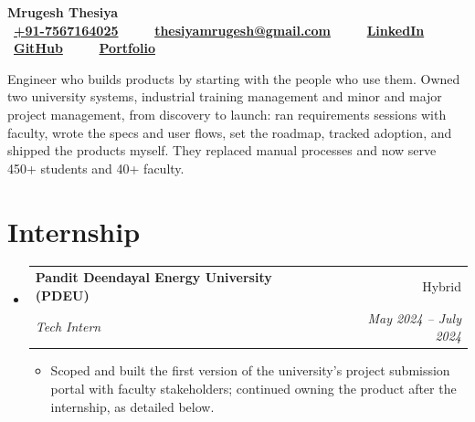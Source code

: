 \documentclass[a4paper,11pt]{article}
\makeatletter
\newcommand{\resumeSubheadingFull}[4]{
  \vspace{-1pt}\item
    \begin{tabular*}{0.97\textwidth}{l@{\extracolsep{\fill}}r}
    \textbf{#1} & #2 \\
    \textit{#3} & \textit{#4} \\
    \end{tabular*}\vspace{-5pt}
}
\newcommand{\resumeSubHeadingListStart}{\begin{itemize}[leftmargin=*]}
\newcommand{\resumeSubHeadingListEnd}{\end{itemize}}
\newcommand{\resumeItemListStart}{\begin{itemize}[itemsep=1pt,topsep=3pt]\small}
\newcommand{\resumeItemListEnd}{\end{itemize}\vspace{-3pt}}
\makeatother
\begin{document}
\begin{center}
    \vspace*{-14pt}
    {\fontsize{32}{36}\selectfont \textbf{Mrugesh Thesiya}}\\[7pt]
    {\small
    \faPhone ~\textbf{\href{tel:+917567164025}{+91-7567164025}}~~~~
    \faEnvelope ~\textbf{\href{mailto:thesiyamrugesh@gmail.com}{thesiyamrugesh@gmail.com}}~~~~
    \faLinkedin ~\textbf{\href{https://www.linkedin.com/in/mrugeshthesiya/}{LinkedIn}}~~~~
    \faGithub ~\textbf{\href{https://github.com/MrugeshThesiya}{GitHub}}~~~~
    \faGlobe ~\textbf{\href{https://mrugesh.pages.dev/}{Portfolio}}
    }
\end{center}

\small{Engineer who builds products by starting with the people who use them. Owned two university systems, industrial training management and minor and major project management, from discovery to launch: ran requirements sessions with faculty, wrote the specs and user flows, set the roadmap, tracked adoption, and shipped the products myself. They replaced manual processes and now serve 450+ students and 40+ faculty.}

\section{Internship}
  \resumeSubHeadingListStart
    \resumeSubheadingFull{Pandit Deendayal Energy University (PDEU)}{Hybrid}
      {Tech Intern}{May 2024 -- July 2024}
      \resumeItemListStart
        \item Scoped and built the first version of the university's project submission portal with faculty stakeholders; continued owning the product after the internship, as detailed below.
      \resumeItemListEnd
  \resumeSubHeadingListEnd

\end{document}
